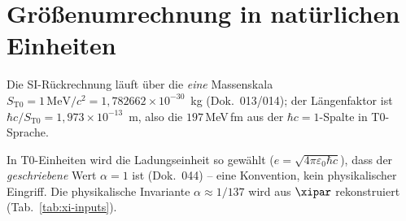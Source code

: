 \section{Größenumrechnung in natürlichen Einheiten}

\begin{table}[htbp]
  \centering
  \caption{Größenumrechnung in natürlichen Einheiten ($\hbar=c=k_B=1$):
           alle dimensionsbehafteten Größen werden zu Potenzen der Energie.}
  \label{tab:nat-umrechnung}
  {\small
  }

  \medskip
  \footnotesize
  Die SI-Rückrechnung läuft über die \emph{eine} Massenskala
  $S_{\mathrm{T0}} = 1\,\mathrm{MeV}/c^2 = 1{,}782662\times10^{-30}$~kg (Dok.~013/014);
  der Längenfaktor ist $\hbar c/S_{\mathrm{T0}} = 1{,}973\times10^{-13}$~m, also die
  $197$\,MeV\,fm aus der $\hbar c=1$-Spalte in T0-Sprache.\par\smallskip
  In T0-Einheiten wird die Ladungseinheit so gewählt
  ($e=\sqrt{4\pi\varepsilon_0\hbar c}$), dass der \emph{geschriebene} Wert
  $\alpha=1$ ist (Dok.~044) -- eine Konvention, kein physikalischer Eingriff.
  Die physikalische Invariante $\alpha\approx1/137$ wird aus $\xipar$ rekonstruiert
  (Tab.~\ref{tab:xi-inputs}).
\end{table}

